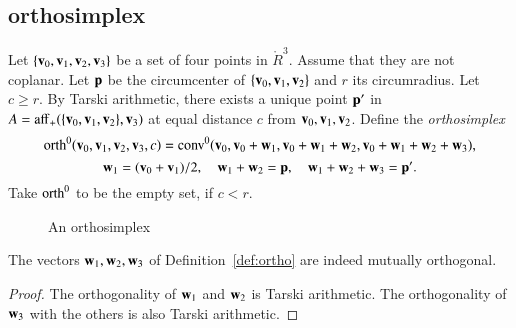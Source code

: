 \subsection{orthosimplex}
%



\begin{definition}[orth] 
Let $\{{\mathbf v}_0,{\mathbf v}_1,{\mathbf v}_2,{\mathbf v}_3\}$ be a set of four points in $\ring{R}^3$.
Assume that they are not coplanar.  Let ${\mathbf p}$ be the circumcenter
of $\{{\mathbf v}_0,{\mathbf v}_1,{\mathbf v}_2\}$ and $r$ its circumradius.  Let $c\ge r$.
By Tarski arithmetic, %
there exists a unique point ${\mathbf p}'$ in $A={\operatorname{aff}}_+(\{{\mathbf v}_0,{\mathbf v}_1,{\mathbf v}_2\},{\mathbf v}_3)$ at equal distance $c$
from ${\mathbf v}_0,{\mathbf v}_1,{\mathbf v}_2$.  Define the {\it orthosimplex}
%
%
$$
    {\operatorname{orth}}^0({\mathbf v}_0,{\mathbf v}_1,{\mathbf v}_2,{\mathbf v}_3,c) = 
   {\operatorname{conv}}^0({\mathbf v}_0,{\mathbf v}_0+{\mathbf w}_1,{\mathbf v}_0+{\mathbf w}_1+{\mathbf w}_2,{\mathbf v}_0+{\mathbf w}_1+{\mathbf w}_2+{\mathbf w}_3),
$$
$$
     {\mathbf w}_1=({\mathbf v}_0+{\mathbf v}_1)/2,\quad {\mathbf w}_1+{\mathbf w}_2={\mathbf p},\quad {\mathbf w}_1+{\mathbf w}_2+{\mathbf w}_3={\mathbf p}'.
$$
Take ${\operatorname{orth}}^0$ to be the empty set, if $c< r$.
%
\end{definition}


\begin{figure}[htb]
  \centering
  \caption{An orthosimplex}
\end{figure}


\begin{lemma} The vectors ${\mathbf w}_1,{\mathbf w}_2,{\mathbf w}_3$ of Definition~\ref{def:ortho}
are indeed mutually orthogonal.
%
\end{lemma}

\begin{proof} The orthogonality of ${\mathbf w}_1$ and ${\mathbf w}_2$ is 
Tarski arithmetic. %
The orthogonality of ${\mathbf w}_3$ with the others is also Tarski arithmetic. %
\end{proof}
%

